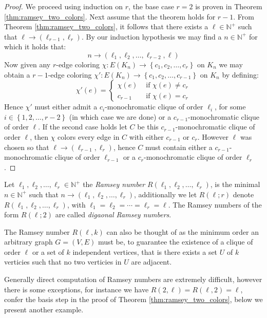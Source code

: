 \begin{proof}
	We proceed using induction on $r$, the base case $r = 2$ is proven in Theorem \ref{thm:ramsey_two_colors}.
	Next assume that the theorem holds for $r - 1$. From Theorem \ref{thm:ramsey_two_colors}, it follows that there exists a $\ell \in \mathbb{N}^{+}$ such that $\ell \to (\ell_{r - 1}, \ell_{r})$.
	By our induction hypothesis we may find a $n \in \mathbb{N}^{+}$ for which it holds that:
	\begin{equation*}
		n \to (\ell_1, \ell_2, \ldots, \ell_{r - 2}, \ell)
	\end{equation*}
	Now given any $r$-edge coloring $\chi: E(K_n) \to \left\{c_1, c_2, \ldots, c_{r}\right\}$ on $K_n$ we may obtain a $r - 1$-edge coloring $\chi': E(K_{n}) \to \left\{c_1, c_2, \ldots, c_{r-1}\right\}$ on $K_n$ by defining:
	\begin{equation*}
		\chi'(e) = \begin{cases} \chi(e) & \text{ if } \chi(e) \neq c_{r} \\ c_{r - 1} & \text{ if } \chi(e) = c_{r} \end{cases}
	\end{equation*}
	Hence $\chi'$ must either admit a $c_{i}$-monochromatic clique of order $\ell_i$, for some $i \in \left\{1, 2, \ldots, r - 2\right\}$ (in which case we are done) or a $c_{r - 1}$-monochromatic clique of order $\ell$. If the second case holds let $C$ be this $c_{r-1}$-monochromatic clique of order $\ell$, then $\chi$ colors every edge in $C$ with either $c_{r - 1}$ or $c_{r}$. However $\ell$ was chosen so that $\ell \to (\ell_{r - 1}, \ell_r)$, hence $C$ must contain either a $c_{r - 1}$-monochromatic clique of order $\ell_{r - 1}$ or a $c_{r}$-monochromatic clique of order $\ell_{r}$.
\end{proof}

\begin{definition}
	Let $\ell_1, \ell_2, \ldots, \ell_r \in \mathbb{N}^{+}$ the \textit{Ramsey number} $R(\ell_1, \ell_2, \ldots, \ell_{r})$, is the minimal $n \in \mathbb{N}^{+}$ such that $n \to (\ell_1, \ell_2, \ldots, \ell_{r})$, additionally we let $R(\ell; r)$ denote $R(\ell_1, \ell_2, \ldots, \ell_{r})$, with $\ell_1 = \ell_2 = \cdots = \ell_r = \ell$. The Ramsey numbers of the form $R(\ell; 2)$ are called \textit{digaonal Ramsey numbers}.
\end{definition}
\begin{remark}
	The Ramsey number $R(\ell,k)$ can also be thought of as the minimum order an arbitrary graph $G = (V, E)$ must be, to guarantee the existence of a clique of order $\ell$ or a set of $k$ independent vertices, that is there exists a set $U$ of $k$ verticies such that no two verticies in $U$ are adjacent.
\end{remark}
Generally direct computation of Ramsey numbers are extremely difficult, however there is some exceptions, for instance we have $R(2, \ell) = R(\ell, 2) = \ell$, confer the basis step in the proof of Theorem \ref{thm:ramsey_two_colors}, below we present another example.

